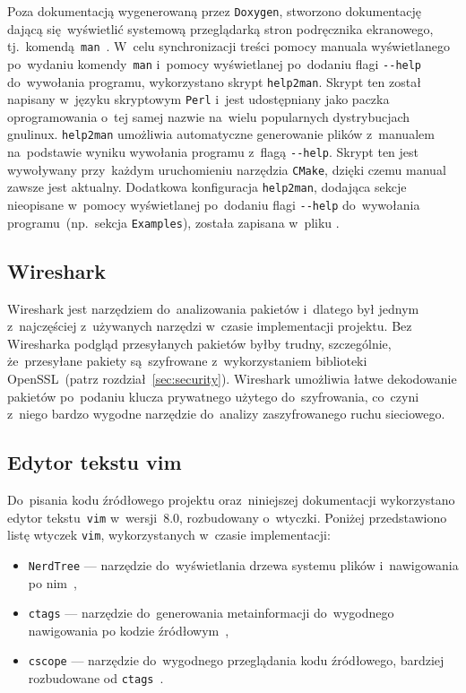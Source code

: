 \documentclass[thesis]{subfiles}
\begin{document}
Poza dokumentacją wygenerowaną przez \texttt{Doxygen}, stworzono dokumentację dającą się~wyświetlić systemową przeglądarką stron podręcznika ekranowego, tj.~komendą~\texttt{man}~\cite{tldp-create-manpage}. W~celu synchronizacji treści pomocy manuala wyświetlanego po~wydaniu komendy~\texttt{man} i~pomocy wyświetlanej po~dodaniu flagi \texttt{-{}-help} do~wywołania programu, wykorzystano skrypt \texttt{help2man}. Skrypt ten został napisany w~języku skryptowym \texttt{Perl} i~jest udostępniany jako paczka oprogramowania o~tej samej nazwie na~wielu popularnych dystrybucjach \gls{gnulinux}. \texttt{help2man} umożliwia automatyczne generowanie plików z~manualem na~podstawie wyniku wywołania programu z~flagą \texttt{-{}-help}. Skrypt ten jest wywoływany przy~każdym uruchomieniu narzędzia \texttt{CMake}, dzięki czemu manual zawsze jest aktualny. Dodatkowa konfiguracja \texttt{help2man}, dodająca sekcje nieopisane w~pomocy wyświetlanej po~dodaniu flagi \texttt{-{}-help} do~wywołania programu~(np.~sekcja \texttt{Examples}), została zapisana w~pliku .


\subsection{Wireshark}

Wireshark jest narzędziem do~analizowania pakietów i~dlatego był jednym z~najczęściej z~używanych narzędzi w~czasie implementacji projektu. Bez Wiresharka podgląd przesyłanych pakietów byłby trudny, szczególnie, że~przesyłane pakiety są~szyfrowane z~wykorzystaniem biblioteki OpenSSL~(patrz rozdział~\ref{sec:security}). Wireshark umożliwia łatwe dekodowanie pakietów po~podaniu klucza prywatnego użytego do~szyfrowania, co~czyni z~niego bardzo wygodne narzędzie do~analizy zaszyfrowanego ruchu sieciowego.


\subsection{Edytor tekstu vim}

Do~pisania kodu źródłowego projektu oraz~niniejszej dokumentacji wykorzystano edytor tekstu~\texttt{vim} w~wersji~8.0, rozbudowany o~wtyczki. Poniżej przedstawiono listę wtyczek \texttt{vim}, wykorzystanych w~czasie implementacji:
\begin{itemize}
	\item\texttt{NerdTree} --- narzędzie do~wyświetlania drzewa systemu plików i~nawigowania po nim~\cite{nerdtree-vimorg,nerdtree-github},
	\item\texttt{ctags} --- narzędzie do~generowania metainformacji do~wygodnego nawigowania po kodzie źródłowym~\cite{ctags},
	\item\texttt{cscope} --- narzędzie do~wygodnego przeglądania kodu źródłowego, bardziej rozbudowane od \texttt{ctags}~\cite{cscope}.
\end{itemize}
\end{document}
